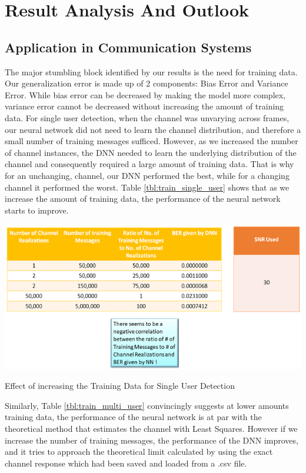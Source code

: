 \section{Result Analysis And Outlook}
\subsection{Application in Communication Systems}
The major stumbling block identified by our results is the need for training data. Our generalization error is made up of 2 components: Bias Error and Variance Error. While bias error can be decreased by making the model more complex, variance error cannot be decreased without increasing the amount of training data. For single user detection, when the channel was unvarying across frames, our neural network did not need to learn the channel distribution, and therefore a small number of training messages sufficed. However, as we increased the number of channel instances, the DNN needed to learn the underlying distribution of the channel and consequently required a large amount of training data. That is why for an unchanging, channel, our DNN performed the best, while for a changing channel it performed the worst. Table \ref{tbl:train_single_user} shows that as we increase the amount of training data, the performance of the neural network starts to improve.\\
\begin{table}[htbp]
  \centering
  \includegraphics[width=\textwidth]{./Figures/train_single_user.png}
  \caption{Effect of increasing the Training Data for Single User Detection}
  \label{tbl:train_single_user}
\end{table}
Similarly, Table \ref{tbl:train_multi_user} convincingly suggests at lower amounts training data, the performance of the neural network is at par with the theoretical method that estimates the channel with Least Squares. However if we increase the number of training messages, the performance of the DNN improves, and it tries to approach the theoretical limit calculated by using the exact channel response which had been saved and loaded from a .csv file.  
